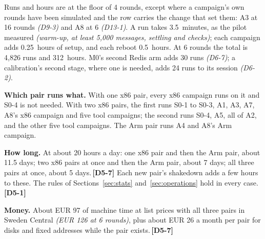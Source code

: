 \documentclass[11pt]{article}
\newcommand{\gl}[1]{{\color{soft}\itshape\small (#1)}}
\newcommand{\chgold}[1]{\,{\color{oldcol}\bfseries\footnotesize[#1]}}
\begin{document}
Runs and hours are at the floor of 4 rounds, except where a campaign's own rounds have been
simulated and the row carries the change that set them: A3 at 16 rounds \gl{D9-3} and A8 at 6
\gl{D13-1}. A run takes 3.5~minutes, as the pilot measured \gl{warm-up, at least 5,000 messages, settling and checks}; each campaign adds 0.25~hours of setup, and each reboot 0.5~hours. At 6 rounds the total is 4,826 runs and 312~hours. M0's second Redis arm adds 30 runs \gl{D6-7}; a calibration's second stage, where one is needed, adds 24 runs to its session \gl{D6-2}.

\textbf{Which pair runs what.} With one x86 pair, every x86 campaign runs on it and S0-4 is not needed. With two x86 pairs, the first runs S0-1 to S0-3, A1, A3, A7, A8's x86 campaign and five tool campaigns; the second runs S0-4, A5, all of A2, and the other five tool campaigns. The Arm pair runs A4 and A8's Arm campaign.

\textbf{How long.} At about 20 hours a day: one x86 pair and then the Arm pair, about 11.5 days; two x86 pairs at once and then the Arm pair, about 7 days; all three pairs at once, about 5 days.\chgold{D5-7} Each new pair's shakedown adds a few hours to these. The rules of Sections~\ref{sec:stats} and~\ref{sec:operations} hold in every case.\chgold{D5-1}

\textbf{Money.} About EUR 97 of machine time at list prices with all three pairs in Sweden Central \gl{EUR 126 at 6 rounds}, plus about EUR 26 a month per pair for disks and fixed addresses while the pair exists.\chgold{D5-7}
\end{document}
